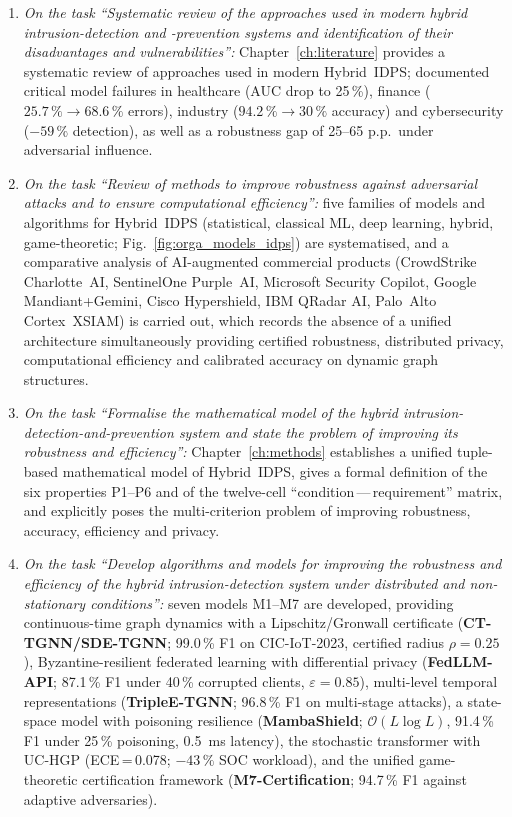 \begin{enumerate}[leftmargin=2em, itemsep=0.3em]

\item \textit{On the task ``Systematic review of the approaches
used in modern hybrid intrusion-detection and -prevention systems
and identification of their disadvantages and vulnerabilities'':}
Chapter~\ref{ch:literature} provides a systematic review
of approaches used in modern Hybrid~IDPS; documented critical
model failures in healthcare (AUC drop to 25\,\%), finance
($25.7\,\%\to 68.6\,\%$ errors), industry ($94.2\,\%\to 30\,\%$
accuracy) and cybersecurity ($-59\,\%$ detection), as well as a
robustness gap of 25--65 p.p.\ under adversarial influence.

\item \textit{On the task ``Review of methods to improve
robustness against adversarial attacks and to ensure computational
efficiency'':} five families of models and algorithms for
Hybrid~IDPS (statistical, classical ML, deep learning, hybrid,
game-theoretic; Fig.~\ref{fig:orga_models_idps}) are
systematised, and a comparative analysis of AI-augmented
commercial products (CrowdStrike Charlotte~AI, SentinelOne
Purple~AI, Microsoft Security Copilot, Google Mandiant+Gemini,
Cisco Hypershield, IBM QRadar AI, Palo~Alto Cortex~XSIAM) is
carried out, which records the absence of a unified architecture
simultaneously providing certified robustness, distributed
privacy, computational efficiency and calibrated accuracy on
dynamic graph structures.

\item \textit{On the task ``Formalise the mathematical model of
the hybrid intrusion-detection-and-prevention system and state the
problem of improving its robustness and efficiency'':}
Chapter~\ref{ch:methods} establishes a unified tuple-based
mathematical model of Hybrid~IDPS, gives a formal definition of
the six properties P1--P6 and of the twelve-cell
``condition\,---\,requirement'' matrix, and explicitly poses the
multi-criterion problem of improving robustness, accuracy,
efficiency and privacy.

\item \textit{On the task ``Develop algorithms and models for
improving the robustness and efficiency of the hybrid
intrusion-detection system under distributed and non-stationary
conditions'':} seven models M1--M7 are developed, providing
continuous-time graph dynamics with a Lipschitz/Gronwall
certificate (\textbf{CT-TGNN/SDE-TGNN}; 99.0\,\% F1 on
CIC-IoT-2023, certified radius $\rho=0.25$), Byzantine-resilient
federated learning with differential privacy (\textbf{FedLLM-API};
87.1\,\% F1 under 40\,\% corrupted clients, $\varepsilon=0.85$),
multi-level temporal representations (\textbf{TripleE-TGNN};
96.8\,\% F1 on multi-stage attacks), a state-space model with
poisoning resilience (\textbf{MambaShield}; $\mathcal{O}(L\log L)$,
91.4\,\% F1 under 25\,\% poisoning, 0.5~ms latency), the
stochastic transformer with UC-HGP (ECE\,=\,0.078;
$-43\,\%$ SOC workload), and the unified game-theoretic
certification framework (\textbf{M7-Certification}; 94.7\,\% F1
against adaptive adversaries).


\end{enumerate}
